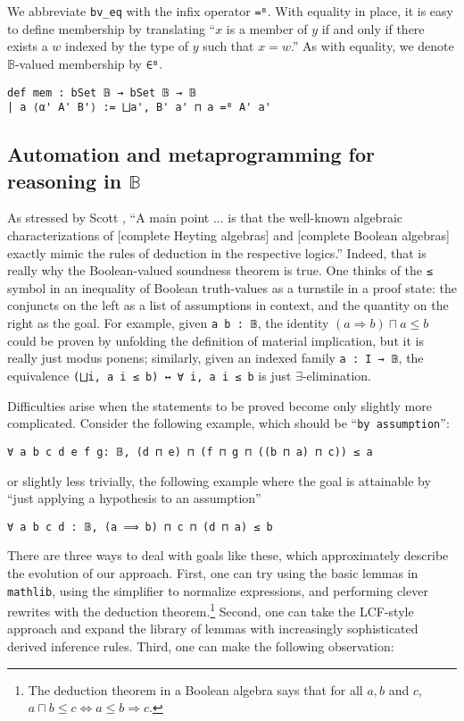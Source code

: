 \documentclass[a4paper,USenglish,cleveref, autoref]{lipics-v2019}
\newcommand{\B}{\mathbb{B}}
\newcommand{\lil}{\lstinline}
\theoremstyle{theorem}
\theoremstyle{definition}
\begin{document}
We abbreviate \lil{bv_eq} with the infix operator \lil{=ᴮ}. With equality in place, it is easy to define membership by translating ``$x$ is a member of $y$ if and only if there exists a $w$ indexed by the type of $y$ such that $x = w$.'' As with equality, we denote $\B$-valued membership by \lil{∈ᴮ}.

\begin{lstlisting}
def mem : bSet 𝔹 → bSet 𝔹 → 𝔹
| a ⟨α' A' B'⟩ := ⨆a', B' a' ⊓ a =ᴮ A' a'
\end{lstlisting}

\subsection{Automation and metaprogramming for reasoning in $\B$} \label{subsect:proof-language}
As stressed by Scott \cite{scott2008algebraic}, ``A main point ... is that the well-known algebraic characterizations of [complete Heyting algebras] and [complete Boolean algebras] exactly mimic the rules of deduction in the respective logics.'' Indeed, that is really why the Boolean-valued soundness theorem is true. One thinks of the \lil{≤} symbol in an inequality of Boolean truth-values as a turnstile in a proof state: the conjuncts on the left as a list of assumptions in context, and the quantity on the right as the goal. For example, given \lil{a b : 𝔹}, the identity $(a \Rightarrow b) \sqcap a \leq b$ could be proven by unfolding the definition of material implication, but it is really just modus ponens; similarly, given an indexed family \lil{a : I → 𝔹}, the equivalence \lstinline{(⨆i, a i ≤ b) ↔ ∀ i, a i ≤ b} is just $\exists$-elimination.

Difficulties arise when the statements to be proved become only slightly more complicated. Consider the following example, which should be  ``\lil{by assumption}'':
\begin{lstlisting}[gobble=2]
  ∀ a b c d e f g: 𝔹, (d ⊓ e) ⊓ (f ⊓ g ⊓ ((b ⊓ a) ⊓ c)) ≤ a
\end{lstlisting}
or slightly less trivially, the following example where the goal is attainable by ``just applying a hypothesis to an assumption''
\begin{lstlisting}[gobble=2]
  ∀ a b c d : 𝔹, (a ⟹ b) ⊓ c ⊓ (d ⊓ a) ≤ b
\end{lstlisting}

There are three ways to deal with goals like these, which approximately describe the evolution of our approach. First, one can try using the basic lemmas in \lil{mathlib}, using the simplifier to normalize expressions, and performing clever rewrites with the deduction theorem.\footnote{The deduction theorem in a Boolean algebra says that for all $a, b$ and $c$, $a \sqcap b \leq c \iff a \leq b \Rightarrow c$.} Second, one can take the LCF-style approach and expand the library of lemmas with increasingly sophisticated derived inference rules. Third, one can make the following observation:
\end{document}
